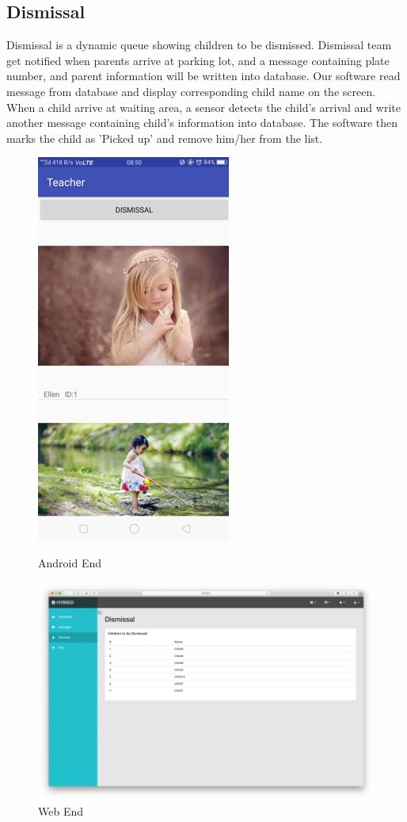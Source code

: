\documentclass{article}
\begin{document}
\subsection{Dismissal}
Dismissal is a dynamic queue showing  children to be dismissed. Dismissal team get notified when parents arrive at parking lot, and a message containing plate number, and parent information will be written into database. Our software read message from database and display corresponding child name on the screen. When a child arrive at waiting area, a sensor detects the child's arrival and write another message containing child's information into database. The software then marks the child as 'Picked up' and remove him/her from the list.
 	\begin{figure}[H] 	
 		\begin{minipage}[b]{0.28\linewidth}
		 	\centering
	 		\includegraphics{img/dismissal1.png}
 			\caption{Android End}
 		\end{minipage}
 		\begin{minipage}[b]{0.68\linewidth} 		
 	 		\centering
 		\includegraphics[width=\linewidth]{img/dismissal2.png}
 		\caption{Web End}
	 	\end{minipage}
 	\end{figure}
 	
\end{document}
